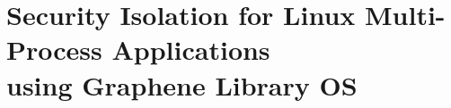 \declarecommand{\sysname}{\graphene{}}

\chapter{Security Isolation for Linux Multi-Process Applications\\ using Graphene Library OS}
\label{chap:graphene}







